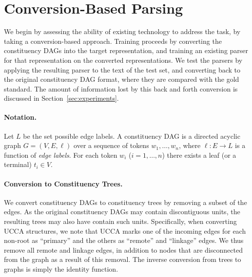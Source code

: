 \documentclass[11pt]{article}
\newcommand{\secref}[1]{Section~\ref{#1}}
\begin{document}




\section{Conversion-Based Parsing}\label{sec:conversion_approach}

We begin by assessing the ability of existing technology to address the task,
by taking a conversion-based approach. Training proceeds by 
converting the constituency DAGs into the target representation,
and training an existing parser for that representation on the converted representations.
We test the parsers by applying the resulting parser to the text of the test set,
and converting back to the original constituency DAG format, where they are compared
with the gold standard.
The amount of information lost by this back and forth conversion is discussed in
\secref{sec:experiments}.

\paragraph{Notation.}
Let $L$ be the set possible edge labels.
A constituency DAG is a directed acyclic graph $G=(V,E, \ell)$
over a sequence of tokens $w_1, \ldots, w_n$,
where $\ell:E\to L$ is a function of \textit{edge labels}.
For each token $w_i$ ($i=1, \ldots, n$) there exists a leaf (or a terminal) $t_i \in V$.

\paragraph{Conversion to Constituency Trees.}
We convert constituency DAGs to constituency trees by removing a subset of the edges.
As the original constituency DAGs may contain discontiguous units, the resulting trees
may also have contain such units.
Specifically, when converting UCCA structures, we note that UCCA marks one of the incoming edges
for each non-root as ``primary'' and the others as ``remote'' and ``linkage'' edges.
We thus remove all remote and linkage edges, in addition to nodes that are disconnected
from the graph as a result of this removal. 
The inverse conversion from trees to graphs is simply the identity function.
\end{document}
